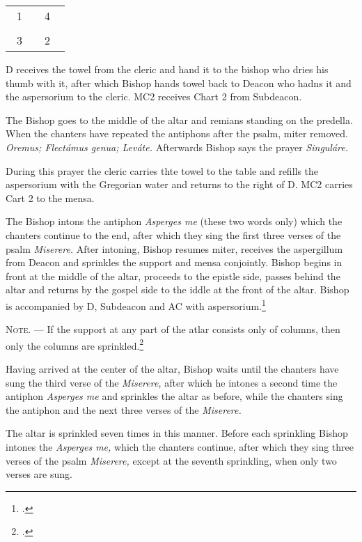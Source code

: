 \documentclass[letterpaper]{report}
\newcommand\crossplan{
\begin{center}
    \begin{tabular}{ | l c r | }
       \hline
        \cross\ {\tiny 1} &         & {\tiny 4} \cross\ \\
                           & \cross &           \\
        \cross\ {\tiny 3} &         & {\tiny 2} \cross\ \\
       \hline
   \end{tabular} 
\end{center}
}
\begin{document}
{\crossplan

D receives the towel from the cleric and hand it to the bishop who dries his
thumb with it, after which Bishop hands towel back to Deacon who hadns it and the
aspersorium to the cleric. MC2 receives Chart 2 from Subdeacon.

\rubric The Bishop goes to the middle of the altar and remians standing on the predella.
When the chanters have repeated the antiphons after the psalm, miter removed.
\textit{Oremus; Flectámus genua; Leváte.} Afterwards Bishop says the prayer
\textit{Singuláre.}

During this prayer the cleric carries thte towel to the table and refills the
aspersorium with the Gregorian water and returns to the right of D. MC2 carries
Cart 2 to the mensa.

\rubric The Bishop intons the antiphon \textit{Asperges me} (these two words only) which
the chanters continue to the end, after which they sing the first three verses
of the psalm \textit{Miserere.} After intoning, Bishop resumes miter, receives the
aspergillum from Deacon and sprinkles the support and mensa conjointly. Bishop begins in
front at the middle of the altar, proceeds to the epistle side, passes behind
the altar and returns by the gospel side to the iddle at the front of the
altar. Bishop is accompanied by D, Subdeacon and AC with aspersorium.\footcite[If the back
part of the altar is attached to the wall, so that the bishop cannot go around
it, he sprinkles only the \textit{base} of the base of the altar when passing
from the middle to the epistle corner, then the epistle side of the altar,
afterwards the table of the altar from the epistle corner to the gospel corner,
then the gospel side of the altar and finaly the \textit{base} in front of the
altar from the gospel corner to the middle.][footnote, p. 68.]{consecranda}

\textsc{Note. ---} If the support at any part of the atlar consists only of
columns, then only the columns are sprinkled.\footcite[][p. 68.]{consecranda}

\rubric Having arrived at the center of the altar, Bishop waits until the chanters
have sung the third verse of the \textit{Miserere,} after which he intones a
second time the antiphon \textit{Asperges me} and sprinkles the altar as
before, while the chanters sing the antiphon and the next three verses of the
\textit{Miserere.}

\rubric The altar is sprinkled seven times in this manner. Before each
sprinkling Bishop intones the \textit{Asperges me,} which the chanters continue,
after which they sing three verses of the psalm \textit{Miserere,} except at
the seventh sprinkling, when only two verses are sung.

}
\end{document}
